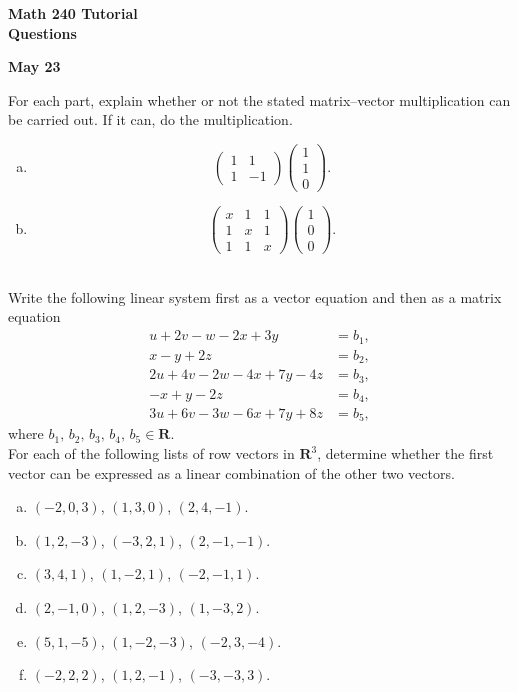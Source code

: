 \documentclass[a4paper,11pt]{article}
\newcommand{\R}{\mathbf{R}}
\begin{document}
\begin{center}
  {\Large\bfseries Math 240 Tutorial \\ Questions}
\end{center}
\begin{center}
  {\bfseries May 23}
\end{center}

 For each part, explain whether or not the stated
matrix--vector multiplication can be carried out. If it can, do the multiplication.
\begin{enumerate}[(a)]
\item
  \[
    \begin{pmatrix}
      1&1\\1&-1
    \end{pmatrix}
    \begin{pmatrix}
      1\\1\\0
    \end{pmatrix}.
  \]
\item
  \[
    \begin{pmatrix}
      x & 1 & 1 \\
      1 & x & 1 \\
      1 & 1 & x
    \end{pmatrix}
    \begin{pmatrix}
      1\\0\\0
    \end{pmatrix}.
  \] \\
\end{enumerate}

 Write the following linear system first as a
vector equation and then as a matrix equation
\begin{align*}
  u+2v-w-2x+3y &= b_1, \\
  x-y+2z &= b_2, \\
  2u+4v-2w-4x+7y-4z &= b_3, \\
  -x+y-2z &= b_4, \\
  3u+6v-3w-6x+7y+8z &= b_5,
\end{align*}
where $b_1,\,b_2,\,b_3,\,b_4,\,b_5 \in \R$. \\

 For each of the following lists of row vectors in
$\R^3$, determine whether the first vector can be expressed as a linear
combination of the other two vectors.
\begin{enumerate}[(a)]
\item $(-2,0,3)$, $(1,3,0)$, $(2,4,-1)$.
\item $(1,2,-3)$, $(-3,2,1)$, $(2,-1,-1)$.
\item $(3,4,1)$, $(1,-2,1)$, $(-2,-1,1)$.
\item $(2,-1,0)$, $(1,2,-3)$, $(1,-3,2)$.
\item $(5,1,-5)$, $(1,-2,-3)$, $(-2,3,-4)$.
\item $(-2,2,2)$, $(1,2,-1)$, $(-3,-3,3)$. \\
\end{enumerate}
\end{document}
